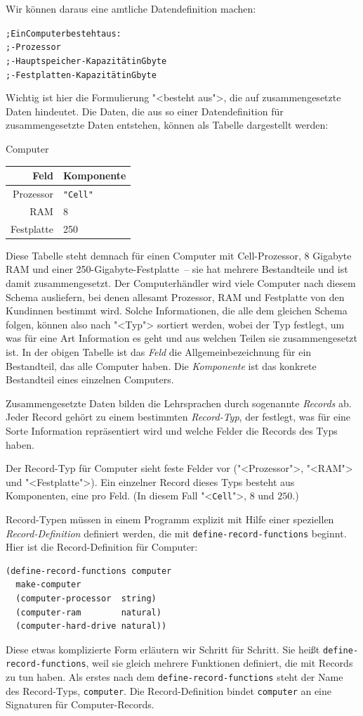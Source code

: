 Wir können daraus eine amtliche Datendefinition machen:
%
\begin{alltt}
; Ein Computer besteht aus:
; - Prozessor
; - Hauptspeicher-Kapazität in Gbyte
; - Festplatten-Kapazität in Gbyte
\end{alltt}
%
Wichtig ist hier die Formulierung "<besteht aus">, die auf
zusammengesetzte Daten hindeutet.  Die Daten, die aus so einer
Datendefinition für zusammengesetzte Daten entstehen, können als
Tabelle dargestellt werden:
%
\begin{center}
  Computer\qquad
  \begin{tabular}[c]{r|l}
    \textbf{Feld} & \textbf{Komponente}\\\hline
     Prozessor & \verb|"Cell"|\\
     RAM & 8\\
    Festplatte & 250
  \end{tabular}
\end{center}
%
Diese Tabelle steht demnach für einen Computer mit Cell-Prozessor, 8
Gigabyte RAM und einer 250-Gigabyte-Festplatte~-- sie hat mehrere
Bestandteile und ist damit zusammengesetzt.  Der Computerhändler wird
viele Computer nach diesem Schema ausliefern, bei denen allesamt
Prozessor, RAM und Festplatte von den Kundinnen bestimmt wird.  Solche
Informationen, die alle dem gleichen Schema folgen, können also nach
"<Typ"> sortiert werden, wobei der Typ
festlegt, um was für eine Art Information es geht und aus welchen
Teilen sie zusammengesetzt ist.  In der obigen Tabelle ist das
\textit{Feld} die Allgemeinbezeichnung für ein Bestandteil, das
alle Computer haben.  Die \textit{Komponente} ist das konkrete
Bestandteil eines einzelnen Computers.

Zusammengesetzte Daten bilden die Lehrsprachen durch
sogenannte \textit{Records} ab.  Jeder Record gehört
zu einem bestimmten
\textit{Record-Typ}, der festlegt, was für eine
Sorte Information repräsentiert wird und welche Felder die Records
des Typs haben.

Der Record-Typ für Computer sieht feste Felder
vor ("<Prozessor">, "<RAM"> und "<Festplatte">).  Ein einzelner Record
dieses Typs besteht aus Komponenten, eine pro
Feld. (In diesem Fall "<\texttt{Cell}">, $8$ und $250$.)

Record-Typen müssen in einem Programm explizit mit Hilfe einer
speziellen \textit{Record-Definition} definiert werden, die mit
\texttt{define-record-functions} beginnt.  Hier ist die
Record-Definition für
Computer:
%
\begin{verbatim}
(define-record-functions computer
  make-computer
  (computer-processor  string)
  (computer-ram        natural)
  (computer-hard-drive natural))
\end{verbatim}
%
Diese etwas komplizierte Form erläutern wir Schritt für Schritt.  Sie
heißt \texttt{define-record-functions}, weil sie gleich mehrere
Funktionen definiert, die mit Records zu tun haben.  Als erstes nach
dem \texttt{define-record-functions} steht der Name des Record-Typs,
\texttt{computer}.  Die Record-Definition bindet \texttt{computer}
an eine Signaturen für Computer-Records.

